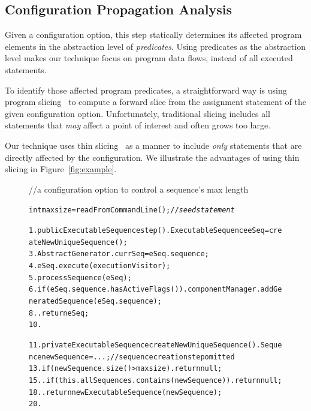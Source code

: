 \subsection{Configuration Propagation Analysis}
\label{sec:prop}

Given a configuration option, this step statically determines its affected program
elements in the abstraction level of \textit{predicates}. Using predicates
as the abstraction level makes our technique focus on program data flows, instead
of all executed statements.

To identify those affected program predicates, a straightforward way is using program
slicing~\cite{Horwitz:1988:ISU} to compute a forward slice from the assignment statement of the given
configuration option. Unfortunately, traditional slicing includes all statements that
\textit{may} affect a point of interest and often grows too large.

Our technique uses thin slicing~\cite{Sridharan:2007} as a manner to include
\textit{only} statements that are directly affected by the configuration.
We illustrate the advantages of using thin slicing 
 in Figure~\ref{fig:example}.

\begin{figure}[t]
\vspace{-2mm}
\small{//a configuration option to control a sequence's max length}
\vspace{-2mm}
\begin{CodeOut}
\begin{alltt}
int maxsize = readFromCommandLine();  //\textit{seed statement}

1.  public ExecutableSequence step() .    ExecutableSequence eSeq = createNewUniqueSequence();
3.    AbstractGenerator.currSeq = eSeq.sequence;
4.    eSeq.execute(executionVisitor);
5.    processSequence(eSeq);
6.    if (eSeq.sequence.hasActiveFlags()) .      componentManager.addGeneratedSequence(eSeq.sequence);
8.    .    return eSeq;
10. \ttrcb

11. private ExecutableSequence createNewUniqueSequence() .   Sequence newSequence = ...; //sequence creation step omitted
13.   if (newSequence.size() > maxsize) .     return null;
15.   .   if (this.allSequences.contains(newSequence)) .     return null;
18.   .   return new ExecutableSequence(newSequence);
20. \ttrcb
\end{alltt}
\end{CodeOut}
\tinystep
\vspace*{-3.0ex}  %
\end{figure}


